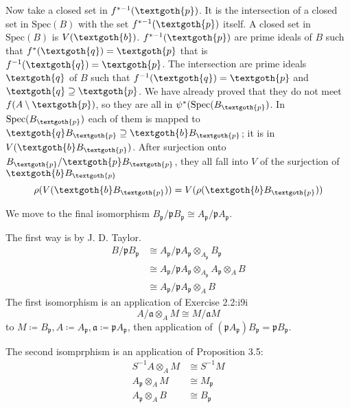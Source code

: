 \documentclass{article}
\newcommand{\mf}{\mathfrak}
\newcommand{\aaa}{\mf a}
\newcommand{\ppp}{\mf p}
\begin{document}
Now take a closed set in $f^{*-1}(\textgoth{p})$. It is the intersection of a closed set in $\textrm{Spec}(B)$ with the set $f^{*-1}(\textgoth{p})$ itself. A closed set in $\textrm{Spec}(B)$ is $V(\textgoth{b})$. $f^{*-1}(\textgoth{p})$ are prime ideals of $B$ such that $f^*(\textgoth{q}) = \textgoth{p}$ that is $f^{-1}(\textgoth{q}) = \textgoth{p}$. The intersection are prime ideals $\textgoth{q}$ of $B$ such that $f^{-1}(\textgoth{q}) = \textgoth{p}$ and $\textgoth{q} \supseteq \textgoth{p}$. We have already proved that they do not meet $f(A \setminus \textgoth{p})$, so they are all in $\psi^*(\textrm{Spec}(B_\textgoth{p})$. In $\textrm{Spec}(B_\textgoth{p})$ each of them is mapped to $\textgoth{q}B_\textgoth{p} \supseteq \textgoth{b}B_\textgoth{p}$; it is in $V(\textgoth{b}B_\textgoth{p})$. After surjection onto $B_\textgoth{p}/\textgoth{p}B_\textgoth{p}$, they all fall into $V$ of the surjection of $\textgoth{b}B_\textgoth{p}$
\[
\rho(V(\textgoth{b}B_\textgoth{p})) = V(\rho(\textgoth{b}B_\textgoth{p}))
\]

We move to the final isomorphism $B_\ppp/ \ppp B_\ppp \cong A_\ppp / \ppp A_\ppp$.

The first way is by J. D. Taylor.
\begin{align*}
B/\ppp B_\ppp & \cong A_\ppp/\ppp A_\ppp \otimes_{A_\ppp} B_\ppp \\
              & \cong A_\ppp/\ppp A_\ppp \otimes_{A_\ppp} A_\ppp \otimes_A B \\
              & \cong A_\ppp/\ppp A_\ppp \otimes_A B
\end{align*}
The first isomorphism is an application of Exercise 2.2:i9i
\[
A/\aaa \otimes_A M \cong M/\aaa M
\]
to $M \coloneqq B_\ppp, A \coloneqq A_\ppp, \aaa \coloneqq \ppp A_\ppp $, then application of 
$(\ppp A_\ppp)B_\ppp = \ppp B_\ppp$.

\noindent
The second isomprphism is an application of Proposition 3.5:
\begin{align*} 
S^{-1}A \otimes_A M & \cong S^{-1}M \\
A_\ppp \otimes_A M & \cong M_\ppp \\
A_\ppp \otimes_A B & \cong B_\ppp
\end{align*} 
\end{document}
